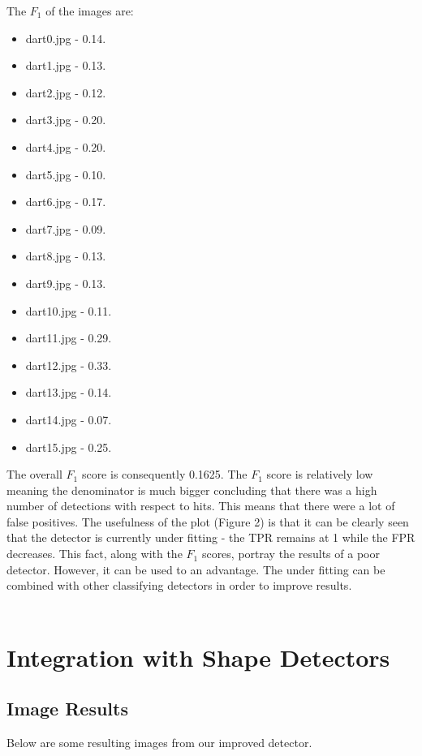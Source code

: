 \documentclass[a4paper]{article}
\begin{document}
The \(F_{1}\) of the images are:
\begin{multicols}{4}
    \begin{itemize}
		\item dart0.jpg - 0.14.
        \item dart1.jpg - 0.13.
        \item dart2.jpg - 0.12.
        \item dart3.jpg - 0.20.
        \item dart4.jpg - 0.20.
        \item dart5.jpg - 0.10.
        \item dart6.jpg - 0.17.
        \item dart7.jpg - 0.09.
        \item dart8.jpg - 0.13.
        \item dart9.jpg - 0.13.
        \item dart10.jpg - 0.11.
        \item dart11.jpg - 0.29.
        \item dart12.jpg - 0.33.
        \item dart13.jpg - 0.14.
        \item dart14.jpg - 0.07.
        \item dart15.jpg - 0.25.
    \end{itemize}
\end{multicols}

The overall \(F_{1}\) score is consequently 0.1625. The \(F_{1}\) score is
relatively low meaning the denominator is much bigger concluding that there was
a high number of detections with respect to hits. This means that there were a
lot of false positives. The usefulness of the plot (Figure 2) is that it can be
clearly seen that the detector is currently under fitting - the TPR remains at
1 while the FPR decreases. This fact, along with the \(F_{1}\) scores, portray
the results of a poor detector. However, it can be used to an advantage. The
under fitting can be combined with other classifying detectors in order to
improve results.
\\\\

\section*{Integration with Shape Detectors}
\subsection*{Image Results}
Below are some resulting images from our improved detector.
\end{document}
